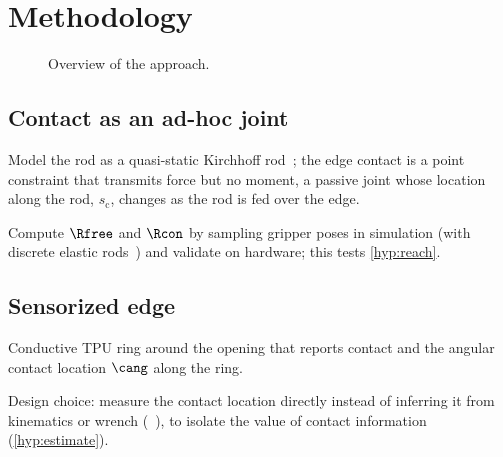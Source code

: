 \section{Methodology}
\label{sec:method}

\begin{figure}[t]
  \centering
  \caption{Overview of the approach.}
  \label{fig:pipeline}
\end{figure}

\subsection{Contact as an ad-hoc joint}
\label{sec:method:reach}
\begin{outline}
  \item Model the rod as a quasi-static Kirchhoff rod~\cite{bretl2014quasistatic};
    the edge contact is a point constraint that transmits force but no moment,
    \ie a passive joint whose location along the rod, $s_{\mathrm{c}}$, changes
    as the rod is fed over the edge.
  \item Compute $\Rfree$ and $\Rcon$ by sampling gripper poses in simulation
    (\eg with discrete elastic rods~\cite{bergou2008der}) and validate on
    hardware; this tests \ref{hyp:reach}.
  \item {}
\end{outline}

\subsection{Sensorized edge}
\label{sec:method:edge}
\begin{outline}
  \item Conductive TPU ring around the opening that reports contact and the
    angular contact location $\cang$ along the ring.
  \item Design choice: measure the contact location directly instead of
    inferring it from kinematics or wrench (\cf~\cite{bajo2012kinematics}), to
    isolate the value of contact information (\ref{hyp:estimate}).
\end{outline}

